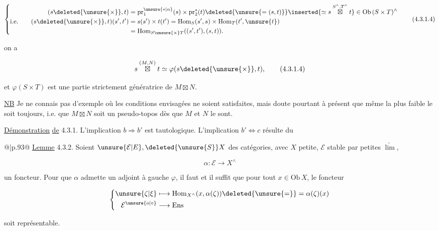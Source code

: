 
\[
\left\{\begin{aligned}
(s\deleted{\unsure{\times}},t)&=\mathrm{pr}_1^{\unsure{*|\alpha}}(s)\times\mathrm{pr}_2^{*}(t)
\deleted{\unsure{=(s,t)}}\inserted{\simeq s\overset{S^\wedge,T^\wedge}{\boxtimes}t}\in\mathrm{Ob}\,(S\times T)^\wedge\\
\text{i.e.}\qquad(s\deleted{\unsure{\times}},t)(s',t')&=s(s')\times t(t')=\mathrm{Hom}_{S}(s',s)\times\mathrm{Hom}_{T}(t',\unsure{t})\\
&=\mathrm{Hom}_{S\unsure{\times}T}((s',t'),(s,t)).
\end{aligned}\right.
\tag*{(4.3.1.4)}
\]


on a

\[
s\overset{(M,N)}{\boxtimes}t\simeq\varphi(s\deleted{\unsure{\times}},t),
\tag*{(4.3.1.4)}
\]


et $\varphi(S\times T)$   est une partie strictement génératrice de $M\boxtimes N$. 

\uline{NB} Je ne connais pas d'exemple où  les conditions envisagées ne soient satisfaites, mais doute pourtant à présent que même la plus faible le soit toujours, i.e. que $M\boxtimes N$ soit un pseudo-topos dès que $M$ et $N$ le sont.

\uline{Démonstration} \uline{de} 4.3.1. L'implication $b\Rightarrow b'$ est tautologique. L'implication $b'\Longleftrightarrow c$ résulte du

\noindent\begin{tabular}{@{}|p{.93\linewidth}@{}}
\uline{Lemme} 4.3.2. Soient $\unsure{\mathcal E|E},\deleted{\unsure{S}}X$ des catégories, avec $X$ petite, $\mathcal E$ stable par petites $\underrightarrow{\lim}$,

\[
\alpha:\mathcal E\longrightarrow X^\wedge
\]

un foncteur. Pour que $\alpha$ admette un adjoint à gauche $\varphi$, il faut et il suffit que pour tout $x\in\mathrm{Ob}\,X$, le foncteur

\[
\left\{\begin{aligned}
\unsure{\zeta|\xi}&\longmapsto \mathrm{Hom}_{X^\wedge}(x,\alpha(\zeta))\deleted{\unsure{=}}=\alpha(\zeta)(x)\\
\mathcal E^{\unsure{o|\circ}}&\longrightarrow\mathrm{Ens}
\end{aligned}\right.
\]

soit représentable.
\end{tabular}

